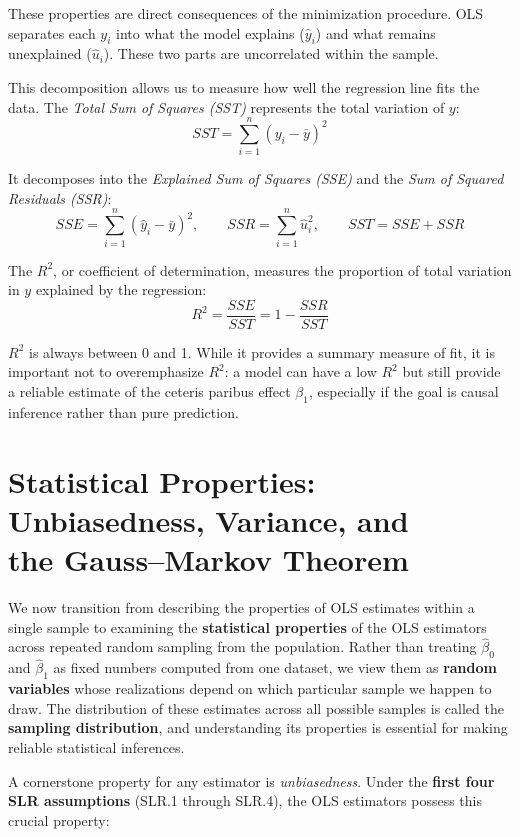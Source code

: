 These properties are direct consequences of the minimization procedure. OLS separates each $y_i$ into what the model explains ($\hat{y}_i$) and what remains unexplained ($\hat{u}_i$). These two parts are uncorrelated within the sample.

This decomposition allows us to measure how well the regression line fits the data. The \emph{Total Sum of Squares (SST)} represents the total variation of $y$:
$$SST = \sum_{i=1}^n (y_i - \bar{y})^2$$

It decomposes into the \emph{Explained Sum of Squares (SSE)} and the \emph{Sum of Squared Residuals (SSR)}:
$$SSE = \sum_{i=1}^n (\hat{y}_i - \bar{y})^2, \qquad SSR = \sum_{i=1}^n \hat{u}_i^2, \qquad SST = SSE + SSR$$

The $R^2$, or coefficient of determination, measures the proportion of total variation in $y$ explained by the regression:
$$R^2 = \frac{SSE}{SST} = 1 - \frac{SSR}{SST}$$

$R^2$ is always between 0 and 1. While it provides a summary measure of fit, it is important not to overemphasize $R^2$: a model can have a low $R^2$ but still provide a reliable estimate of the ceteris paribus effect $\beta_1$, especially if the goal is causal inference rather than pure prediction.

\section[Statistical Properties: Unbiasedness, Variance, and the Gauss--Markov Theorem]{Statistical Properties: Unbiasedness, Variance, and\\ the Gauss--Markov Theorem}

We now transition from describing the properties of OLS estimates within a single sample to examining the \textbf{statistical properties} of the OLS estimators across repeated random sampling from the population. Rather than treating $\hat{\beta}_0$ and $\hat{\beta}_1$ as fixed numbers computed from one dataset, we view them as \textbf{random variables} whose realizations depend on which particular sample we happen to draw. The distribution of these estimates across all possible samples is called the \textbf{sampling distribution}, and understanding its properties is essential for making reliable statistical inferences.

A cornerstone property for any estimator is \emph{unbiasedness}. Under the \textbf{first four SLR assumptions} (SLR.1 through SLR.4), the OLS estimators possess this crucial property:

